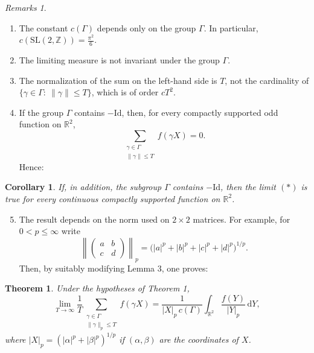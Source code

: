 \documentclass[11pt]{article}
\newtheorem{theorem}{Theorem}
\newtheorem{corollary}{Corollary}
\theoremstyle{remark}
\newtheorem*{remarks}{Remarks}
\newcommand{\R}{\mathbb{R}}
\newcommand{\Z}{\mathbb{Z}}
\newcommand{\rd}{\mathrm{d}}
\newcommand{\SL}{\mathrm{SL}}
\newcommand{\Id}{\mathrm{Id}}
\begin{document}
\begin{remarks}
\begin{enumerate}
\item The constant $c(\Gamma)$ depends only on the group $\Gamma$. In particular,
$c(\SL(2,\Z))=\frac{\pi^2}{6}$.
\item The limiting measure is not invariant under the group $\Gamma$.
\item The normalization of the sum on the left-hand side is $T$, not the cardinality of
$\{\gamma\in\Gamma:\ \|\gamma\|\le T\}$, which is of order $cT^2$.
\item If the group $\Gamma$ contains $-\Id$, then, for every compactly supported odd function on $\R^2$,
\[
\sum_{\substack{\gamma\in\Gamma\\ \|\gamma\|\le T}} f(\gamma X)=0.
\]
Hence:
\end{enumerate}
\end{remarks}

\begin{corollary}
If, in addition, the subgroup $\Gamma$ contains $-\Id$, then the limit $(*)$ is true for every continuous compactly supported function on $\R^2$.
\end{corollary}

\begin{enumerate}
\setcounter{enumi}{4}
\item The result depends on the norm used on $2\times2$ matrices. For example, for $0<p\le\infty$ write
\[
\left\|\begin{pmatrix}a&b\\ c&d\end{pmatrix}\right\|_p
=\bigl(|a|^p+|b|^p+|c|^p+|d|^p\bigr)^{1/p}.
\]
Then, by suitably modifying Lemma 3, one proves:
\end{enumerate}

\begin{theorem}
Under the hypotheses of Theorem 1,
\begin{equation}\tag{$*$$_p$}
\lim_{T\to\infty}\frac{1}{T}\sum_{\substack{\gamma\in\Gamma\\ \|\gamma\|_p\le T}} f(\gamma X)
=\frac{1}{|X|_p\,c(\Gamma)}\int_{\R^2}\frac{f(Y)}{|Y|_p}\,\rd Y,
\end{equation}
where $|X|_p=(|\alpha|^p+|\beta|^p)^{1/p}$ if $(\alpha,\beta)$ are the coordinates of $X$.
\end{theorem}
\end{document}

